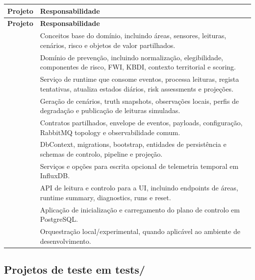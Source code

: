 \begin{longtable}{L{0.38\textwidth} L{0.52\textwidth}}
\toprule
\textbf{Projeto} & \textbf{Responsabilidade} \\
\midrule
\endfirsthead
\toprule
\textbf{Projeto} & \textbf{Responsabilidade} \\
\midrule
\endhead
{} & Conceitos base do domínio, incluindo áreas, sensores, leituras, cenários, risco e objetos de valor partilhados. \\
 & Domínio de prevenção, incluindo normalização, elegibilidade, componentes de risco, FWI, KBDI, contexto territorial e scoring. \\
 & Serviço de runtime que consome eventos, processa leituras, regista tentativas, atualiza estados diários, risk assessments e projeções. \\
 & Geração de cenários, truth snapshots, observações locais, perfis de degradação e publicação de leituras simuladas. \\
 & Contratos partilhados, envelope de eventos, payloads, configuração, RabbitMQ topology e observabilidade comum. \\
 & DbContext, migrations, bootstrap, entidades de persistência e schemas de controlo, pipeline e projeção. \\
 & Serviços e opções para escrita opcional de telemetria temporal em InfluxDB. \\
 & API de leitura e controlo para a UI, incluindo endpoints de áreas, runtime summary, diagnostics, runs e reset. \\
 & Aplicação de inicialização e carregamento do plano de controlo em PostgreSQL. \\
 & Orquestração local/experimental, quando aplicável ao ambiente de desenvolvimento. \\
\bottomrule
\end{longtable}

\subsection{Projetos de teste em tests/}

